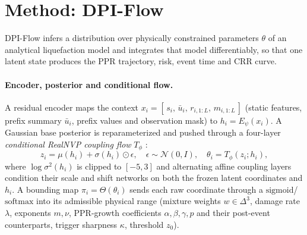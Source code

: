 \documentclass[letterpaper]{article} %
\begin{document}
\section{Method: DPI-Flow}
DPI-Flow infers a distribution over physically constrained parameters $\theta$ of an analytical
liquefaction model and integrates that model differentiably, so that one latent state produces the PPR
trajectory, risk, event time and CRR curve.

\paragraph{Encoder, posterior and conditional flow.} A residual encoder maps the context
$x_i=[\,s_i,\,\bar{u}_i,\,r_{i,1:L},\,m_{i,1:L}\,]$ (static features, prefix summary $\bar u_i$, prefix
values and observation mask) to $h_i=E_\psi(x_i)$. A Gaussian base posterior is reparameterized and pushed
through a four-layer \emph{conditional RealNVP coupling flow} $T_\phi$ \citep{rezende15,realnvp17}:
\begin{equation}
z_i=\mu(h_i)+\sigma(h_i)\odot\epsilon,\quad \epsilon\sim\mathcal{N}(0,I),\quad \theta_i=T_\phi(z_i;h_i),
\end{equation}
where $\log\sigma^2(h_i)$ is clipped to $[-5,3]$ and alternating affine coupling layers condition their
scale and shift networks on both the frozen latent coordinates and $h_i$. A bounding map $\pi_i=\Theta(\theta_i)$ sends each raw
coordinate through a $\mathrm{sigmoid}$/$\mathrm{softmax}$ into its admissible physical range (mixture
weights $w\in\Delta^3$, damage rate $\lambda$, exponents $m,\nu$, PPR-growth coefficients
$\alpha,\beta,\gamma,p$ and their post-event counterparts, trigger sharpness $\kappa$, threshold $z_0$).
\end{document}
